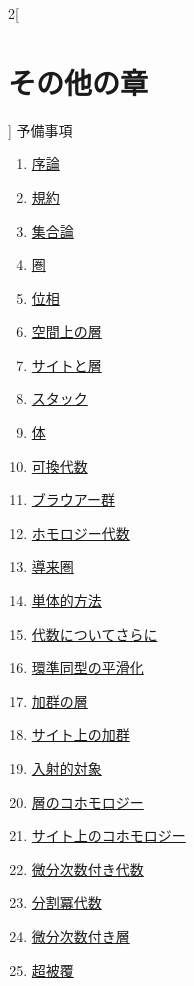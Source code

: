 \begin{multicols}{2}[\section{その他の章}]
\noindent
予備事項
\begin{enumerate}
\item \hyperref[introduction-section-phantom]{序論}
\item \hyperref[conventions-section-phantom]{規約}
\item \hyperref[sets-section-phantom]{集合論}
\item \hyperref[categories-section-phantom]{圏}
\item \hyperref[topology-section-phantom]{位相}
\item \hyperref[sheaves-section-phantom]{空間上の層}
\item \hyperref[sites-section-phantom]{サイトと層}
\item \hyperref[stacks-section-phantom]{スタック}
\item \hyperref[fields-section-phantom]{体}
\item \hyperref[algebra-section-phantom]{可換代数}
\item \hyperref[brauer-section-phantom]{ブラウアー群}
\item \hyperref[homology-section-phantom]{ホモロジー代数}
\item \hyperref[derived-section-phantom]{導来圏}
\item \hyperref[simplicial-section-phantom]{単体的方法}
\item \hyperref[more-algebra-section-phantom]{代数についてさらに}
\item \hyperref[smoothing-section-phantom]{環準同型の平滑化}
\item \hyperref[modules-section-phantom]{加群の層}
\item \hyperref[sites-modules-section-phantom]{サイト上の加群}
\item \hyperref[injectives-section-phantom]{入射的対象}
\item \hyperref[cohomology-section-phantom]{層のコホモロジー}
\item \hyperref[sites-cohomology-section-phantom]{サイト上のコホモロジー}
\item \hyperref[dga-section-phantom]{微分次数付き代数}
\item \hyperref[dpa-section-phantom]{分割冪代数}
\item \hyperref[sdga-section-phantom]{微分次数付き層}
\item \hyperref[hypercovering-section-phantom]{超被覆}

\end{enumerate}
\end{multicols}
